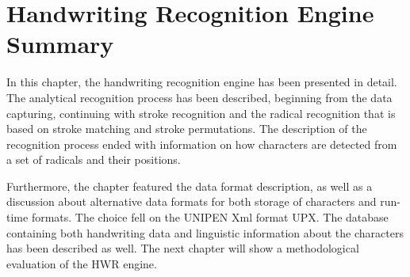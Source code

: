 

\section{Handwriting Recognition Engine Summary}
\label{sec:hwre:summary}

In this chapter, the handwriting recognition engine has been presented in detail.
The analytical recognition process has been described, beginning from the data 
capturing, continuing with stroke recognition and the radical recognition that is
based on stroke matching and stroke permutations. The description of the
recognition process ended with information on how characters are detected from
a set of radicals and their positions.

Furthermore, the chapter featured the data format description, as well as a 
discussion about alternative data formats for both storage of characters 
and run-time formats. The choice fell on the UNIPEN Xml format UPX. The database
containing both handwriting data and linguistic information about the characters
has been described as well.
The next chapter will show a methodological evaluation of the HWR engine.